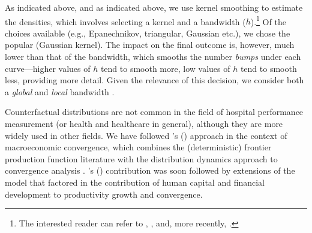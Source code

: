 \documentclass[11pt,a4paper,oneside]{article}
\begin{document}
As indicated above, and as indicated above, we use kernel smoothing to estimate  the densities, which involves selecting a kernel and a bandwidth ($h$).\footnote{The interested reader can refer to \cite{silverman}, \cite{scott}, \cite{li.racine.monograph} and, more recently, \cite{henderson_parmeter2015applied_econometrics}.} Of the choices available (e.g., Epanechnikov, triangular, Gaussian etc.), we chose the popular (Gaussian kernel). The impact on the final outcome is, however, much lower than that of the bandwidth, which smooths the number \textsl{bumps} under each curve---higher values of $h$ tend to smooth more, low values of $h$ tend to smooth less, providing more detail. Given the relevance of this decision, we consider both a \textsl{global} \citep[same amount of smoothing at all data points, see][]{sheatherjones} and \textsl{local} bandwidth \citep[varying amount of smoothing dependent on the structure of the data at a given point, see][]{loader1996local.annals}.




Counterfactual distributions are not common in the field of hospital performance measurement (or health and healthcare in general), although they are more widely used in other fields. We have followed \citeauthor{kumarrussell}'s (\citeyear{kumarrussell}) approach in the context of macroeconomic convergence, which combines the (deterministic) frontier production function literature \citep{faregrosskopflovell95} with the distribution dynamics approach to convergence analysis \citep{quahaftergalton,quahgalton}. \citeauthor{kumarrussell}'s (\citeyear{kumarrussell}) contribution was soon followed by extensions of the model that factored in the contribution of human capital \citep{hendersonrussellhuman} and financial development \citep{badunenko2013financial} to productivity growth and convergence. 
\end{document}
